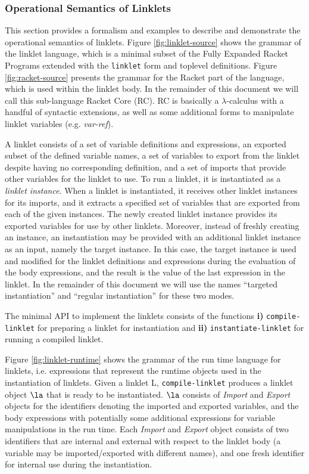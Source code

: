 \subsubsection{Operational Semantics of Linklets}

This section provides a formalism and examples to describe and
demonstrate the operational semantics of linklets. Figure
\ref{fig:linklet-source} shows the grammar of the linklet language,
which is a minimal subset of the Fully Expanded Racket Programs
extended with the \verb|linklet| form and toplevel definitions. Figure
\ref{fig:racket-source} presents the grammar for the Racket part of
the language, which is used within the linklet body. In the remainder
of this document we will call this sub-language Racket Core (RC). RC
is basically a $\lambda$-calculus with a handful of syntactic extensions, as
well as some additional forms to manipulate linklet variables
(e.g. \emph{var-ref}).

\twocolumn

A linklet consists of a set of variable definitions and expressions,
an exported subset of the defined variable names, a set of variables
to export from the linklet despite having no corresponding definition,
and a set of imports that provide other variables for the linklet to
use. To run a linklet, it is instantiated as a \emph{linklet
  instance}. When a linklet is instantiated, it receives other linklet
instances for its imports, and it extracts a specified set of
variables that are exported from each of the given instances. The
newly created linklet instance provides its exported variables for use
by other linklets. Moreover, instead of freshly creating an instance,
an instantiation may be provided with an additional linklet instance
as an input, namely the target instance. In this case, the target
instance is used and modified for the linklet definitions and
expressions during the evaluation of the body expressions, and the
result is the value of the last expression in the linklet. In the
remainder of this document we will use the names ``targeted
instantiation'' and ``regular instantiation'' for these two modes.

The minimal API to implement the linklets consists of the functions
\textbf{i)} \verb|compile-linklet| for preparing a linklet for
instantiation and \textbf{ii)} \verb|instantiate-linklet| for running
a compiled linklet.

Figure \ref{fig:linklet-runtime} shows the grammar of the run\dash
time language for linklets, i.e. expressions that represent the
run\dash time objects used in the instantiation of linklets. Given a
linklet L, \verb|compile-linklet| produces a linklet object $\la$ that
is ready to be instantiated. $\la$ consists of \textit{Import} and
\textit{Export} objects for the identifiers denoting the imported and
exported variables, and the body expressions with potentially some
additional expressions for variable manipulations in the run\dash
time. Each \textit{Import} and \textit{Export} object consists of two
identifiers that are internal and external with respect to the linklet
body (a variable may be imported/exported with different names), and
one fresh identifier for internal use during the instantiation.

